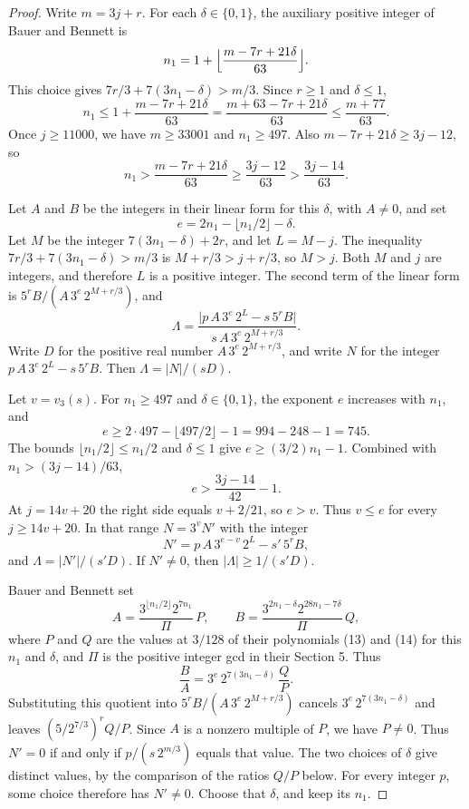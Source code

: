 \documentclass[11pt]{article}
\begin{document}
\begin{proof}
Write $m = 3j + r$.
For each $\delta \in \{0, 1\}$, the auxiliary positive integer of Bauer and Bennett is
\[
n_1 = 1 + \Bigl\lfloor \frac{m - 7r + 21\delta}{63} \Bigr\rfloor.
\]
This choice gives $7r/3 + 7(3n_1 - \delta) > m/3$.
Since $r \ge 1$ and $\delta \le 1$,
\[
n_1 \le 1 + \frac{m - 7r + 21\delta}{63} = \frac{m + 63 - 7r + 21\delta}{63} \le \frac{m + 77}{63}.
\]
Once $j \ge 11000$, we have $m \ge 33001$ and $n_1 \ge 497$.
Also $m - 7r + 21\delta \ge 3j - 12$, so
\[
n_1 > \frac{m - 7r + 21\delta}{63} \ge \frac{3j - 12}{63} > \frac{3j - 14}{63}.
\]

Let $A$ and $B$ be the integers in their linear form for this $\delta$, with $A \ne 0$, and set
\[
e = 2n_1 - \lfloor n_1/2 \rfloor - \delta.
\]
Let $M$ be the integer $7(3n_1 - \delta) + 2r$, and let $L = M - j$.
The inequality $7r/3 + 7(3n_1 - \delta) > m/3$ is $M + r/3 > j + r/3$, so $M > j$.
Both $M$ and $j$ are integers, and therefore $L$ is a positive integer.
The second term of the linear form is $5^r B/(A\, 3^e\, 2^{M + r/3})$, and
\[
\Lambda = \frac{\lvert p\, A\, 3^e\, 2^L - s\, 5^r B \rvert}{s\, A\, 3^e\, 2^{M + r/3}}.
\]
Write $D$ for the positive real number $A\, 3^e\, 2^{M + r/3}$, and write $N$ for the integer $p\, A\, 3^e\, 2^L - s\, 5^r B$.
Then $\Lambda = \lvert N \rvert/(s D)$.

Let $v = v_3(s)$.
For $n_1 \ge 497$ and $\delta \in \{0, 1\}$, the exponent $e$ increases with $n_1$, and
\[
e \ge 2 \cdot 497 - \lfloor 497/2 \rfloor - 1 = 994 - 248 - 1 = 745.
\]
The bounds $\lfloor n_1/2 \rfloor \le n_1/2$ and $\delta \le 1$ give $e \ge (3/2)n_1 - 1$.
Combined with $n_1 > (3j - 14)/63$,
\[
e > \frac{3j - 14}{42} - 1.
\]
At $j = 14v + 20$ the right side equals $v + 2/21$, so $e > v$.
Thus $v \le e$ for every $j \ge 14v + 20$.
In that range $N = 3^v N'$ with the integer
\[
N' = p\, A\, 3^{e - v}\, 2^L - s'\, 5^r B,
\]
and $\Lambda = \lvert N' \rvert/(s' D)$.
If $N' \ne 0$, then $\lvert \Lambda \rvert \ge 1/(s' D)$.

Bauer and Bennett set
\[
A = \frac{3^{\lfloor n_1/2 \rfloor} 2^{7n_1}}{\Pi}\, P, \qquad
B = \frac{3^{2n_1 - \delta} 2^{28n_1 - 7\delta}}{\Pi}\, Q,
\]
where $P$ and $Q$ are the values at $3/128$ of their polynomials (13) and (14) for this $n_1$ and $\delta$, and $\Pi$ is the positive integer gcd in their Section 5.
Thus
\[
\frac{B}{A} = 3^{e}\, 2^{7(3n_1 - \delta)}\, \frac{Q}{P}.
\]
Substituting this quotient into $5^r B/(A\, 3^e\, 2^{M + r/3})$ cancels $3^e\, 2^{7(3n_1 - \delta)}$ and leaves $(5/2^{7/3})^r Q/P$.
Since $A$ is a nonzero multiple of $P$, we have $P \ne 0$.
Thus $N' = 0$ if and only if $p/(s\, 2^{m/3})$ equals that value.
The two choices of $\delta$ give distinct values, by the comparison of the ratios $Q/P$ below.
For every integer $p$, some choice therefore has $N' \ne 0$.
Choose that $\delta$, and keep its $n_1$.


\end{proof}
\end{document}
